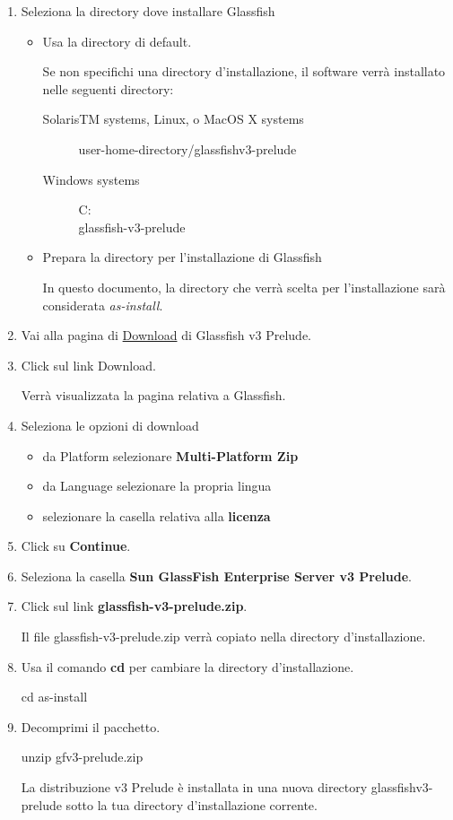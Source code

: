 \documentclass[11pt,a4paper]{article}
\begin{document}
\begin{enumerate}
 \item Seleziona la directory dove installare Glassfish
\begin{itemize}
 \item Usa la directory di default.

Se non specifichi una directory d'installazione, il software verrà installato nelle seguenti directory:
\begin{description}
 \item[SolarisTM systems, Linux, o MacOS X systems] 

user-home-directory/glassfishv3-prelude
\item[Windows systems] 

C:\\glassfish-v3-prelude
 \end{description}
\item Prepara la directory per l'installazione di Glassfish

In questo documento, la directory che verrà scelta per l'installazione sarà considerata \textit{as-install}.
\end{itemize}
\item Vai alla pagina di \href{http://www.sun.com/software/products/glassfishv3_prelude/get.jsp}{Download}  di Glassfish v3 Prelude.
\item Click sul link Download. 

Verrà visualizzata la pagina relativa a Glassfish.
\item Seleziona le opzioni di download
\begin{itemize}
 \item da Platform selezionare \textbf{Multi-Platform Zip}
 \item da Language selezionare la propria lingua
 \item selezionare la casella relativa alla \textbf{licenza}
\end{itemize}
\item Click su \textbf{Continue}.
\item Seleziona la casella \textbf{Sun GlassFish Enterprise Server v3 Prelude}.
\item Click sul link \textbf{glassfish-v3-prelude.zip}.

Il file glassfish-v3-prelude.zip verrà copiato nella directory d'installazione.
\item Usa il comando \textbf{cd} per cambiare la directory d'installazione.

cd as-install
\item Decomprimi il pacchetto.

unzip gfv3-prelude.zip

La distribuzione v3 Prelude è installata in una nuova directory glassfishv3-prelude sotto la tua directory d'installazione corrente.
\end{enumerate}
\end{document}
